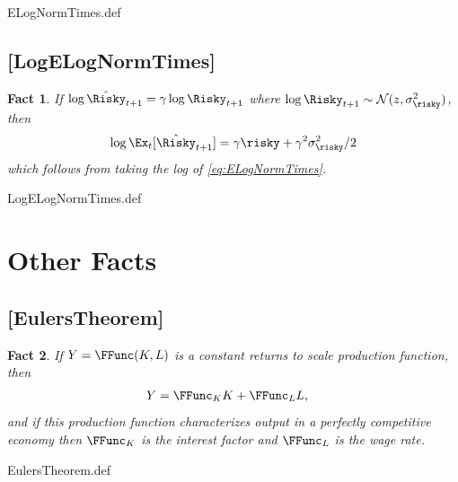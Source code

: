 \documentclass{handout}
\newtheorem{Fact}{Fact}
\begin{document}
\begin{verbatimwrite}{ELogNormTimes.def}
\providecommand{\ELogNormTimes}{\href{http://www.econ2.jhu.edu/people/ccarroll/public/LectureNotes/MathFacts/MathFactsList\#ELogNormTimes}{\ensuremath{\mathtt{[ELogNormTimes]}}}}
\end{verbatimwrite}

\hypertarget{LogELogNormTimes}{}
\subsection{[LogELogNormTimes]}

\begin{Fact} If $\log \hat{\Risky}_{t+1} = \gamma \log \Risky_{t+1}$ where $\log \Risky_{t+1} \sim \mathcal{N}(z,\sigma_{\risky}^{2})$, then
\begin{equation}
        \log \Ex_{t}[\hat{\Risky}_{t+1}] = \gamma \risky+\gamma^{2}\sigma_{\risky}^{2}/2 \label{eq:LogELogNormTimes}
\end{equation}
which follows from taking the log of \eqref{eq:ELogNormTimes}.

\end{Fact}

\begin{verbatimwrite}{LogELogNormTimes.def}
\providecommand{\LogELogNormTimes}{\href{http://www.econ2.jhu.edu/people/ccarroll/public/LectureNotes/MathFacts/MathFactsList\#LogELogNormTimes}{\ensuremath{\mathtt{[LogELogNormTimes]}}}}
\end{verbatimwrite}




\section{Other Facts}

\hypertarget{EulersTheorem}{}
\subsection{[EulersTheorem]}\label{fact:EulersTheorem}

\begin{Fact} If $Y=\FFunc(K,L)$ is a constant returns to scale production
function, then
\begin{equation}\begin{gathered}\begin{aligned}
        Y & =  \FFunc_{K} K + \FFunc_{L} L,
\end{aligned}\end{gathered}\end{equation}
and if this production function characterizes output in a perfectly 
competitive economy then $\FFunc_{K}$ is the interest factor and $\FFunc_{L}$ is
the wage rate.

\end{Fact}
\begin{verbatimwrite}{EulersTheorem.def}
\providecommand{\EulersTheorem}{\href{http://www.econ2.jhu.edu/people/ccarroll/public/LectureNotes/MathFacts/MathFactsList\#EulersTheorem}{\ensuremath{\mathtt{[EulersTheorem]}}}}
\end{verbatimwrite}

\end{document}
